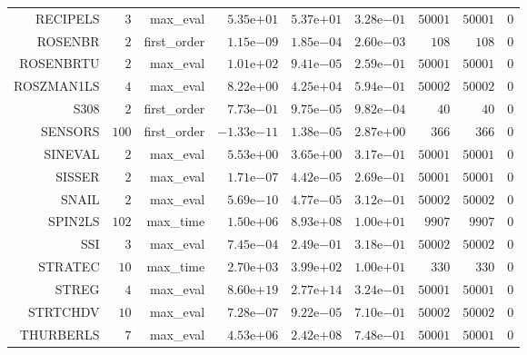 \begin{longtable}{rrrrrrrrr}
RECIPELS & \(     3\) & max\_eval & \( 5.35\)e\(+01\) & \( 5.37\)e\(+01\) & \( 3.28\)e\(-01\) & \( 50001\) & \( 50001\) & \(     0\) \\
ROSENBR & \(     2\) & first\_order & \( 1.15\)e\(-09\) & \( 1.85\)e\(-04\) & \( 2.60\)e\(-03\) & \(   108\) & \(   108\) & \(     0\) \\
ROSENBRTU & \(     2\) & max\_eval & \( 1.01\)e\(+02\) & \( 9.41\)e\(-05\) & \( 2.59\)e\(-01\) & \( 50001\) & \( 50001\) & \(     0\) \\
ROSZMAN1LS & \(     4\) & max\_eval & \( 8.22\)e\(+00\) & \( 4.25\)e\(+04\) & \( 5.94\)e\(-01\) & \( 50002\) & \( 50002\) & \(     0\) \\
S308 & \(     2\) & first\_order & \( 7.73\)e\(-01\) & \( 9.75\)e\(-05\) & \( 9.82\)e\(-04\) & \(    40\) & \(    40\) & \(     0\) \\
SENSORS & \(   100\) & first\_order & \(-1.33\)e\(-11\) & \( 1.38\)e\(-05\) & \( 2.87\)e\(+00\) & \(   366\) & \(   366\) & \(     0\) \\
SINEVAL & \(     2\) & max\_eval & \( 5.53\)e\(+00\) & \( 3.65\)e\(+00\) & \( 3.17\)e\(-01\) & \( 50001\) & \( 50001\) & \(     0\) \\
SISSER & \(     2\) & max\_eval & \( 1.71\)e\(-07\) & \( 4.42\)e\(-05\) & \( 2.69\)e\(-01\) & \( 50001\) & \( 50001\) & \(     0\) \\
SNAIL & \(     2\) & max\_eval & \( 5.69\)e\(-10\) & \( 4.77\)e\(-05\) & \( 3.12\)e\(-01\) & \( 50002\) & \( 50002\) & \(     0\) \\
SPIN2LS & \(   102\) & max\_time & \( 1.50\)e\(+06\) & \( 8.93\)e\(+08\) & \( 1.00\)e\(+01\) & \(  9907\) & \(  9907\) & \(     0\) \\
SSI & \(     3\) & max\_eval & \( 7.45\)e\(-04\) & \( 2.49\)e\(-01\) & \( 3.18\)e\(-01\) & \( 50002\) & \( 50002\) & \(     0\) \\
STRATEC & \(    10\) & max\_time & \( 2.70\)e\(+03\) & \( 3.99\)e\(+02\) & \( 1.00\)e\(+01\) & \(   330\) & \(   330\) & \(     0\) \\
STREG & \(     4\) & max\_eval & \( 8.60\)e\(+19\) & \( 2.77\)e\(+14\) & \( 3.24\)e\(-01\) & \( 50001\) & \( 50001\) & \(     0\) \\
STRTCHDV & \(    10\) & max\_eval & \( 7.28\)e\(-07\) & \( 9.22\)e\(-05\) & \( 7.10\)e\(-01\) & \( 50002\) & \( 50002\) & \(     0\) \\
THURBERLS & \(     7\) & max\_eval & \( 4.53\)e\(+06\) & \( 2.42\)e\(+08\) & \( 7.48\)e\(-01\) & \( 50001\) & \( 50001\) & \(     0\) \\

\end{longtable}

